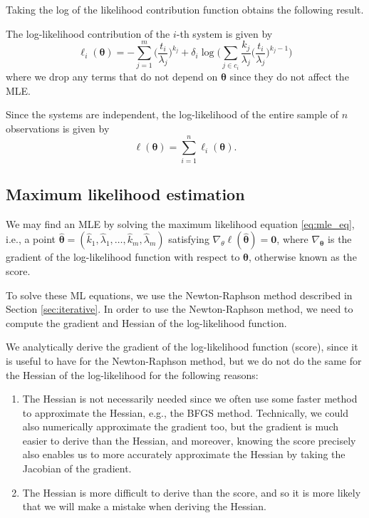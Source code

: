 \documentclass[
]{article}
\begin{document}
Taking the log of the likelihood contribution function obtains the
following result.

\begin{corollary}
The log-likelihood contribution of the $i$-th system is given by
\begin{equation}
\label{eq:weibull_log_likelihood_contribution}
\ell_i(\boldsymbol{\theta}) =
-\sum_{j=1}^{m}\biggl(\frac{t_i}{\lambda_j}\biggr)^{k_j} +
    \delta_i \log \!\Biggl(    
        \sum_{j \in c_i} \frac{k_j}{\lambda_j}\biggl(\frac{t_i}{\lambda_j}\biggr)^{k_j-1}
    \Biggr)
\end{equation}
where we drop any terms that do not depend on $\boldsymbol{\theta}$ since they do not
affect the MLE.
\end{corollary}

Since the systems are independent, the log-likelihood of the entire
sample of \(n\) observations is given by \begin{equation}
\label{eq:weibull_log_likelihood}
\ell(\boldsymbol{\theta}) = \sum_{i=1}^n \ell_i(\boldsymbol{\theta}).
\end{equation}

\hypertarget{maximum-likelihood-estimation}{%
\subsection{Maximum likelihood
estimation}\label{maximum-likelihood-estimation}}

We may find an MLE by solving the maximum likelihood equation
\eqref{eq:mle_eq}, i.e., a point
\(\boldsymbol{\hat\theta} = (\hat{k}_1,\hat{\lambda}_1,\ldots,\hat{k}_m,\hat{\lambda}_m)\)
satisfying
\(\nabla_{\theta} \ell(\boldsymbol{\hat\theta}) = \boldsymbol{0}\),
where \(\nabla_{\boldsymbol{\theta}}\) is the gradient of the
log-likelihood function with respect to \(\boldsymbol{\theta}\),
otherwise known as the score.

To solve these ML equations, we use the Newton-Raphson method described
in Section \ref{sec:iterative}. In order to use the Newton-Raphson
method, we need to compute the gradient and Hessian of the
log-likelihood function.

We analytically derive the gradient of the log-likelihood function
(score), since it is useful to have for the Newton-Raphson method, but
we do not do the same for the Hessian of the log-likelihood for the
following reasons:

\begin{enumerate}
\def\labelenumi{\arabic{enumi}.}
\item
  The Hessian is not necessarily needed since we often use some faster
  method to approximate the Hessian, e.g., the BFGS method. Technically,
  we could also numerically approximate the gradient too, but the
  gradient is much easier to derive than the Hessian, and moreover,
  knowing the score precisely also enables us to more accurately
  approximate the Hessian by taking the Jacobian of the gradient.
\item
  The Hessian is more difficult to derive than the score, and so it is
  more likely that we will make a mistake when deriving the Hessian.
\end{enumerate}
\end{document}
